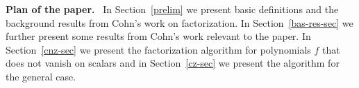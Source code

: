 \smallskip

\noindent\textbf{Plan of the paper.}~ In Section~\ref{prelim} we
present basic definitions and the background results from Cohn's work on factorization. In Section~\ref{bas-res-sec} we further present some results from Cohn's work relevant to the paper. In
Section~\ref{cnz-sec} we present the factorization algorithm for
polynomials $f$ that does not vanish on scalars and in
Section~\ref{cz-sec} we present the algorithm for the general case.
